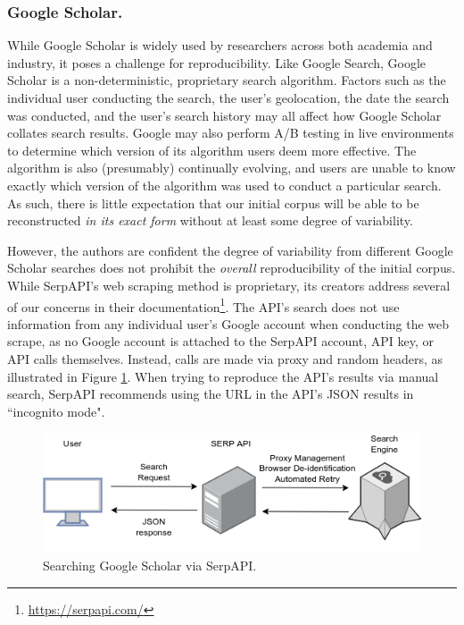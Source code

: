 \documentclass[manuscript,screen,review]{acmart}
\begin{document}
\subsubsection{Google Scholar.} While Google Scholar is widely used by researchers across both academia and industry, it poses a challenge for reproducibility. Like Google Search, Google Scholar is a non-deterministic, proprietary search algorithm. Factors such as the individual user conducting the search, the user's geolocation, the date the search was conducted, and the user's search history may all affect how Google Scholar collates search results. Google may also perform A/B testing in live environments to determine which version of its algorithm users deem more effective. The algorithm is also (presumably) continually evolving, and users are unable to know exactly which version of the algorithm was used to conduct a particular search. As such, there is little expectation that our initial corpus will be able to be reconstructed \textit{in its exact form} without at least some degree of variability.

However, the authors are confident the degree of variability from different Google Scholar searches does not prohibit the \textit{overall} reproducibility of the initial corpus. While SerpAPI's web scraping method is proprietary, its creators address several of our concerns in their documentation\footnote{\href{https://serpapi.com/}{https://serpapi.com/}}. The API's search does not use information from any individual user's Google account when conducting the web scrape, as no Google account is attached to the SerpAPI account, API key, or API calls themselves. Instead, calls are made via proxy and random headers, as illustrated in Figure \ref{fig:serpAPI}. When trying to reproduce the API's results via manual search, SerpAPI recommends using the URL in the API's JSON results in ``incognito mode". 

\begin{figure}
    \includegraphics[width=\textwidth]{img/SERP_API_diagram.drawio.png}
    \caption{Searching Google Scholar via SerpAPI.}
    \label{fig:serpAPI}
\end{figure}
\end{document}
